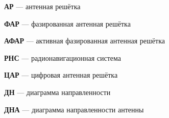 
{
\noindent \textbf{АР} --- антенная решётка

\noindent \textbf{ФАР} --- фазированная антенная решётка

\noindent \textbf{АФАР} --- активная фазированная антенная решётка

\noindent \textbf{РНС} --- радионавигационная система

\noindent \textbf{ЦАР} --- цифровая антенная решётка

\noindent \textbf{ДН} --- диаграмма направленности

\noindent \textbf{ДНА} --- диаграмма направленности антенны
}